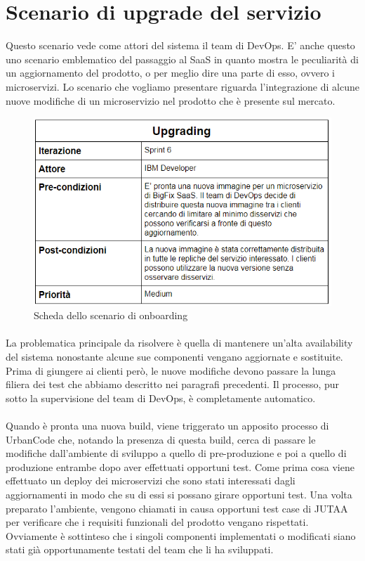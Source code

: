 \section{Scenario di upgrade del servizio}
Questo scenario vede come attori del sistema il team di DevOps. E' anche questo uno scenario emblematico del passaggio al SaaS in quanto mostra le peculiarità di un aggiornamento del prodotto, o per meglio dire una parte di esso, ovvero i microservizi. Lo scenario che vogliamo presentare riguarda l'integrazione di alcune nuove modifiche di un microservizio nel prodotto che è presente sul mercato. 
\begin{figure}[h]
	\centering
	\includegraphics[width=0.7\linewidth]{capitoli/imgs/upgradescenarioScheda}
	\caption{Scheda dello scenario di onboarding}
	\label{fig:upgradescenarioscheda}
\end{figure}
\paragraph{}
La problematica principale da risolvere è quella di mantenere un'alta availability del sistema nonostante alcune sue componenti vengano aggiornate e sostituite. Prima di giungere ai clienti però, le nuove modifiche devono passare la lunga filiera dei test che abbiamo descritto nei paragrafi precedenti. Il processo, pur sotto la supervisione del team di DevOps, è completamente automatico. 
\paragraph{}
Quando è pronta una nuova build, viene triggerato un apposito processo di UrbanCode che, notando la presenza di questa build, cerca di passare le modifiche dall'ambiente di sviluppo a quello di pre-produzione e poi a quello di produzione entrambe dopo aver effettuati opportuni test. Come prima cosa viene effettuato un deploy dei microservizi che sono stati interessati dagli aggiornamenti in modo che su di essi si possano girare opportuni test. Una volta preparato l'ambiente, vengono chiamati in causa opportuni test case di JUTAA per verificare che i requisiti funzionali del prodotto vengano rispettati. Ovviamente è sottinteso che i singoli componenti implementati o modificati siano stati già opportunamente testati del team che li ha sviluppati. 
